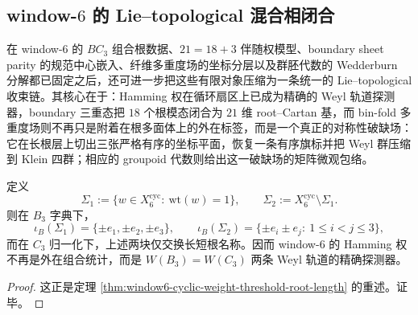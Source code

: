 \subsection{window-\texorpdfstring{$6$}{6} 的 Lie--topological 混合相闭合}\label{subsec:conclusion-window6-lie-topological-hybrid-phase}
在 window-\(6\) 的 \(BC_3\) 组合根数据、\(21=18+3\) 伴随权模型、boundary sheet parity 的规范中心嵌入、纤维多重度场的坐标分层以及群胚代数的 Wedderburn 分解都已固定之后，还可进一步把这些有限对象压缩为一条统一的 Lie--topological 收束链。其核心在于：Hamming 权在循环扇区上已成为精确的 Weyl 轨道探测器，boundary 三重态把 \(18\) 个根模态闭合为 \(21\) 维 root--Cartan 基，而 bin-fold 多重度场则不再只是附着在根多面体上的外在标签，而是一个真正的对称性破缺场：它在长根层上切出三张严格有序的坐标平面，恢复一条有序旗标并把 Weyl 群压缩到 Klein 四群；相应的 groupoid 代数则给出这一破缺场的矩阵微观包络。

\begin{corollary}\label{cor:conclusion-window6-hamming-weyl-orbit-detector}
定义
\[
\Sigma_1:=\{w\in X_6^{\mathrm{cyc}}:\ \mathrm{wt}(w)=1\},
\qquad
\Sigma_2:=X_6^{\mathrm{cyc}}\setminus \Sigma_1.
\]
则在 \(B_3\) 字典下，
\[
\iota_B(\Sigma_1)=\{\pm e_1,\pm e_2,\pm e_3\},
\qquad
\iota_B(\Sigma_2)=\{\pm e_i\pm e_j:\ 1\le i<j\le 3\},
\]
而在 \(C_3\) 归一化下，上述两块仅交换长短根名称。因而 window-\(6\) 的 Hamming 权不再是外在组合统计，而是 \(W(B_3)=W(C_3)\) 两条 Weyl 轨道的精确探测器。
\end{corollary}
\begin{proof}
这正是定理 \ref{thm:window6-cyclic-weight-threshold-root-length} 的重述。证毕。
\end{proof}

